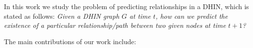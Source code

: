 In this work we study the problem of predicting relationships in a DHIN, which is stated as follows: \textit{Given a DHIN graph $G$ at time $t$, how can we predict the existence of a particular relationship/path between two given nodes at time $t+1$?}







The main contributions of our work include:


